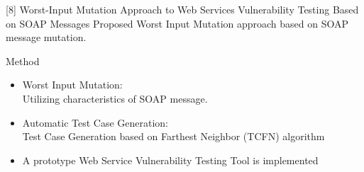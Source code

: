 \documentclass{bredelebeamer}
\begin{document}
\begin{frame}{[8] Worst-Input Mutation Approach to Web Services Vulnerability Testing Based on SOAP Messages}
	\large
	Proposed Worst Input Mutation approach based on SOAP message mutation.
	\begin{block}{Method}
		\begin{itemize}
			\large
			\item Worst Input Mutation:\\
			Utilizing characteristics of SOAP message.
			\item Automatic Test Case Generation:\\
			Test Case Generation based on Farthest Neighbor (TCFN) algorithm
			\item A prototype Web Service Vulnerability Testing Tool is implemented
		\end{itemize}
	\end{block}
\end{frame}
\end{document}
